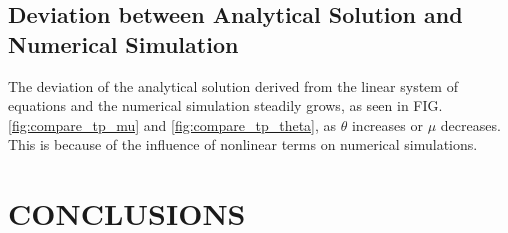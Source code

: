 \documentclass[aps,prd,twocolumn,amsmath,amssymb,groupedaddress]{revtex4-2}
\begin{document}
\subsection{\label{subsec:deviation} Deviation between Analytical Solution and Numerical Simulation}

The deviation of the analytical solution derived from the linear system of equations and the numerical simulation steadily grows, as seen in FIG. \ref{fig:compare_tp_mu} and \ref{fig:compare_tp_theta}, as $\theta$ increases or $\mu$ decreases. This is because of the influence of nonlinear terms on numerical simulations.

\section{\label{sec:conclusion} CONCLUSIONS}


%


\end{document}

